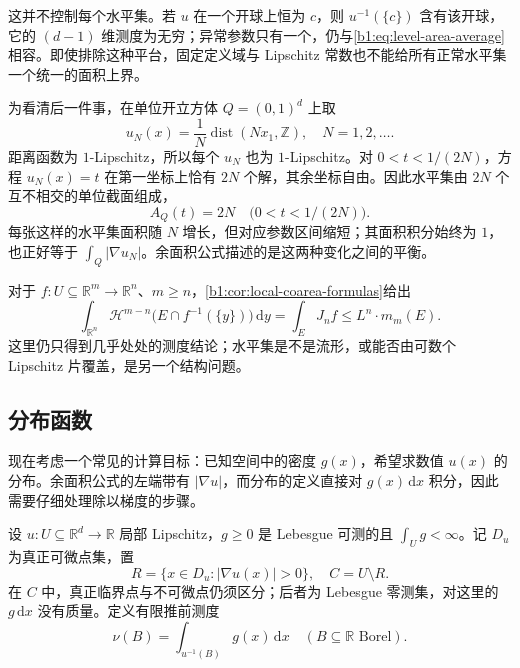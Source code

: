 这并不控制每个水平集。若 \(u\) 在一个开球上恒为 \(c\)，则 \(u^{-1}(\{c\})\) 含有该开球，它的 \((d-1)\) 维测度为无穷；异常参数只有一个，仍与\eqref{b1:eq:level-area-average}相容。即使排除这种平台，固定定义域与 Lipschitz 常数也不能给所有正常水平集一个统一的面积上界。

\ProseParagraphBreak

为看清后一件事，在单位开立方体 \(Q=(0,1)^d\) 上取
\[
 u_N(x)=\frac1N\operatorname{dist}(Nx_1,\mathbb Z),
 \quad N=1,2,\ldots.
\]
距离函数为 \(1\)-Lipschitz，所以每个 \(u_N\) 也为 \(1\)-Lipschitz。对 \(0<t<1/(2N)\)，方程 \(u_N(x)=t\) 在第一坐标上恰有 \(2N\) 个解，其余坐标自由。因此水平集由 \(2N\) 个互不相交的单位截面组成，
\[
 A_Q(t)=2N\quad\bigl(0<t<1/(2N)\bigr).
\]
每张这样的水平集面积随 \(N\) 增长，但对应参数区间缩短；其面积积分始终为 \(1\)，也正好等于 \(\int_Q|\nabla u_N|\)。余面积公式描述的是这两种变化之间的平衡。

\ProseParagraphBreak

对于 \(f:U\subseteq\mathbb R^m\to\mathbb R^n\)、\(m\geq n\)，\cref{b1:cor:local-coarea-formulas}给出
\[
 \int_{\mathbb R^n}\mathcal H^{m-n}
       \bigl(E\cap f^{-1}(\{y\})\bigr)\,\mathrm dy
 =\int_EJ_nf\leq L^n\cdot m_m(E).
\]
这里仍只得到几乎处处的测度结论；水平集是不是流形，或能否由可数个 Lipschitz 片覆盖，是另一个结构问题。

\subsection{分布函数}
\label{b1:subsec:180303}

现在考虑一个常见的计算目标：已知空间中的密度 \(g(x)\)，希望求数值 \(u(x)\) 的分布。余面积公式的左端带有 \(|\nabla u|\)，而分布的定义直接对 \(g(x)\,\mathrm dx\) 积分，因此需要仔细处理除以梯度的步骤。

\ProseParagraphBreak

设 \(u:U\subseteq\mathbb R^d\to\mathbb R\) 局部 Lipschitz，\(g\geq0\) 是 Lebesgue 可测的且 \(\int_Ug<\infty\)。记 \(D_u\) 为真正可微点集，置
\[
 R=\{x\in D_u:|\nabla u(x)|>0\},\quad C=U\setminus R.
\]
在 \(C\) 中，真正临界点与不可微点仍须区分；后者为 Lebesgue 零测集，对这里的 \(g\,\mathrm dx\) 没有质量。定义有限推前测度
\[
 \nu(B)=\int_{u^{-1}(B)}g(x)\,\mathrm dx
 \quad(B\subseteq\mathbb R\text{ Borel}).
\]

